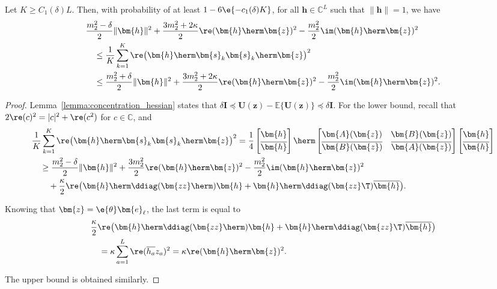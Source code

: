 \begin{cor} \label{cor:re2} %
	Let $K\geq C_1(\delta)L$. Then, with probability of at least $1-6\e{-c_1(\delta)K}$, for all $\bm{h}\in\mathbb{C}^L$ such that $\|\bm{h}\|=1$, we have
	\begin{align}
		&\frac{m_2^2-\delta}{2}\|\bm{h}\|^2+\frac{3m_2^2+2\kappa}{2}\re(\bm{h}\herm\bm{z})^2-\frac{m_2^2}{2}\im(\bm{h}\herm\bm{z})^2\nonumber\\
		&\quad\leq\frac{1}{K}\sum_{k=1}^K\re\big(\bm{h}\herm\bm{s}_k\bm{s}_k\herm\bm{z}\big)^2\nonumber\\
		&\quad\leq  \frac{m_2^2+\delta}{2}\|\bm{h}\|^2+\frac{3m_2^2+2\kappa}{2}\re(\bm{h}\herm\bm{z})^2-\frac{m_2^2}{2}\im(\bm{h}\herm\bm{z})^2. \nonumber%
	\end{align}
\end{cor}
\begin{proof}
	Lemma~\ref{lemma:concentration_hessian} states that 	$\delta\bm{I}\preceq\bm{U}(\bm{z})-\mathbb{E}\{\bm{U}(\bm{z})\}\preceq\delta\bm{I}$.
	For the lower bound, recall that  $2\re(c)^2=|c|^2+\re(c^2)$ for $c\in\mathbb{C}$, and 
	\begin{align}
		&\frac{1}{K}\sum_{k=1}^K\re\big(\bm{h}\herm\bm{s}_k\bm{s}_k\herm\bm{z}\big)^2
		=\frac{1}{4}\begin{bmatrix}
			\bm{h}\\[0.2em]
			\overline{\bm{h}}
		\end{bmatrix}\herm
		\begin{bmatrix}
			\bm{A}(\bm{z})&\bm{B}(\bm{z})\\[0.2em]
			\overline{\bm{B}(\bm{z})}&\overline{\bm{A}(\bm{z})}
		\end{bmatrix}
		\begin{bmatrix}
			\bm{h}\\[0.2em]
			\overline{\bm{h}}
		\end{bmatrix}\nonumber\\
		&\quad\geq\frac{m_2^2-\delta}{2}\|\bm{h}\|^2+\frac{3m_2^2}{2}\re(\bm{h}\herm\bm{z})^2-\frac{m_2^2}{2} \im(\bm{h}\herm\bm{z})^2\nonumber\\
		&\quad\quad+\frac{\kappa}{2}\re\big(\bm{h}\herm\ddiag(\bm{zz}\herm)\bm{h}+\bm{h}\herm\ddiag(\bm{zz}\T)\overline{\bm{h}}\big). \nonumber%
	\end{align}
	
	Knowing that $\bm{z}=\e{\theta}\bm{e}_{\ell}$, the last term is equal to 
	\begin{align}
		&\frac{\kappa}{2}\re\big(\bm{h}\herm\ddiag(\bm{zz}\herm)\bm{h}+\bm{h}\herm\ddiag(\bm{zz}\T)\overline{\bm{h}}\big)\nonumber\\
		&\quad=\kappa\sum_{a=1}^L\re(\overline{h_a}z_a)^2=\kappa\re(\bm{h}\herm\bm{z})^2.\nonumber%
	\end{align}
	
	The upper bound is obtained similarly.
\end{proof}


